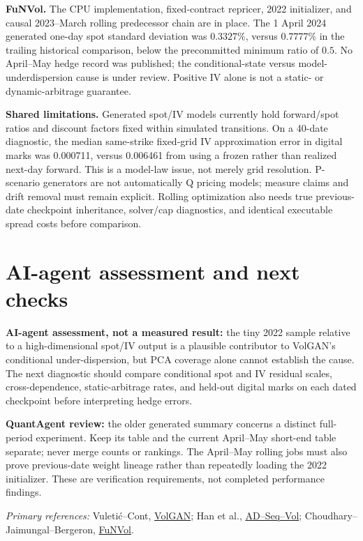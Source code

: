 \documentclass[10pt]{article}
\begin{document}
\textbf{FuNVol.} The CPU implementation, fixed-contract repricer, 2022
initializer, and causal 2023--March rolling predecessor chain are in place.
The 1 April 2024 generated one-day spot standard deviation was $0.3327\%$,
versus $0.7777\%$ in the trailing historical comparison, below the
precommitted minimum ratio of $0.5$. No April--May hedge record was published;
the conditional-state versus model-underdispersion cause is under review.
Positive IV alone is not a static- or dynamic-arbitrage guarantee.

\textbf{Shared limitations.} Generated spot/IV models currently hold
forward/spot ratios and discount factors fixed within simulated transitions.
On a 40-date diagnostic, the median same-strike fixed-grid IV approximation
error in digital marks was 0.000711, versus 0.006461 from using a frozen
rather than realized next-day forward. This is a model-law issue, not merely
grid resolution. P-scenario generators are not automatically Q pricing models;
measure claims and drift removal must remain explicit. Rolling optimization
also needs true previous-date checkpoint inheritance, solver/cap diagnostics,
and identical executable spread costs before comparison.

\section{AI-agent assessment and next checks}

\textbf{AI-agent assessment, not a measured result:} the tiny 2022 sample
relative to a high-dimensional spot/IV output is a plausible contributor to
VolGAN's conditional under-dispersion, but PCA coverage alone cannot establish
the cause. The next diagnostic should compare conditional spot and IV residual
scales, cross-dependence, static-arbitrage rates, and held-out digital marks on
each dated checkpoint before interpreting hedge errors.

\textbf{QuantAgent review:} the older generated summary concerns a distinct
full-period experiment. Keep its table and the current April--May short-end
table separate; never merge counts or rankings. The April--May rolling jobs
must also prove previous-date weight lineage rather than repeatedly loading
the 2022 initializer. These are verification requirements, not completed
performance findings.

\vspace{0.5em}
\textit{Primary references:} Vuleti\'c--Cont, \href{https://doi.org/10.1080/1350486X.2025.2471317}{VolGAN};
Han et al., \href{https://arxiv.org/abs/2609.13402}{AD--Seq--Vol};
Choudhary--Jaimungal--Bergeron, \href{https://doi.org/10.1080/14697688.2024.2396977}{FuNVol}.
\end{document}
